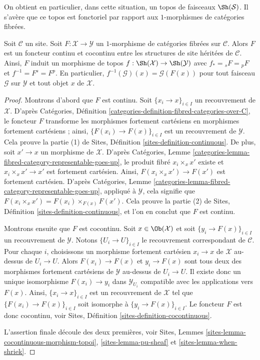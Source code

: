 \noindent
On obtient en particulier, dans cette situation, un topos de faisceaux
$\Sh(\mathcal{S})$. Il s'avère que ce topos est fonctoriel par rapport
aux $1$-morphismes de catégories fibrées.

\begin{lemma}
\label{lemma-topology-inherited-functorial}
Soit $\mathcal{C}$ un site. Soit $F : \mathcal{X} \to \mathcal{Y}$
un $1$-morphisme de catégories fibrées sur $\mathcal{C}$.
Alors $F$ est un foncteur continu et cocontinu entre les structures
de site héritées de $\mathcal{C}$. Ainsi, $F$ induit un morphisme de topos
$f : \Sh(\mathcal{X}) \to \Sh(\mathcal{Y})$ avec
$f_* = {}_sF = {}_pF$ et $f^{-1} = F^s = F^p$. En particulier,
$f^{-1}(\mathcal{G})(x) = \mathcal{G}(F(x))$
pour tout faisceau $\mathcal{G}$ sur $\mathcal{Y}$ et tout objet $x$ de $\mathcal{X}$.
\end{lemma}

\begin{proof}
Montrons d'abord que $F$ est continu.
Soit $\{x_i \to x\}_{i \in I}$ un recouvrement de $\mathcal{X}$. D'après
Catégories, Définition \ref{categories-definition-fibred-categories-over-C},
le foncteur $F$ transforme les morphismes fortement cartésiens en morphismes
fortement cartésiens ; ainsi, $\{F(x_i) \to F(x)\}_{i \in I}$ est un recouvrement
de $\mathcal{Y}$. Cela prouve la partie (1) de
Sites, Définition \ref{sites-definition-continuous}.
De plus, soit $x' \to x$ un morphisme de $\mathcal{X}$. D'après
Catégories, Lemme \ref{categories-lemma-fibred-category-representable-goes-up},
le produit fibré $x_i \times_x x'$ existe et $x_i \times_x x' \to x'$
est fortement cartésien. Ainsi, $F(x_i \times_x x') \to F(x')$ est fortement
cartésien. D'après
Catégories, Lemme \ref{categories-lemma-fibred-category-representable-goes-up},
appliqué à $\mathcal{Y}$, cela signifie que
$F(x_i \times_x x') = F(x_i) \times_{F(x)} F(x')$.
Cela prouve la partie (2) de
Sites, Définition \ref{sites-definition-continuous},
et l'on en conclut que $F$ est continu.

\medskip\noindent
Montrons ensuite que $F$ est cocontinu.
Soit $x \in \Ob(\mathcal{X})$ et soit $\{y_i \to F(x)\}_{i \in I}$
un recouvrement de $\mathcal{Y}$. Notons $\{U_i \to U\}_{i \in I}$ le
recouvrement correspondant de $\mathcal{C}$. Pour chaque $i$, choisissons un morphisme
fortement cartésien $x_i \to x$ de $\mathcal{X}$ au-dessus de $U_i \to U$.
Alors $F(x_i) \to F(x)$ et $y_i \to F(x)$ sont tous deux des morphismes
fortement cartésiens de $\mathcal{Y}$ au-dessus de $U_i \to U$. Il existe donc
un unique isomorphisme $F(x_i) \to y_i$ dans $\mathcal{Y}_{U_i}$ compatible
avec les applications vers $F(x)$. Ainsi, $\{x_i \to x\}_{i \in I}$ est un recouvrement de
$\mathcal{X}$ tel que $\{F(x_i) \to F(x)\}_{i \in I}$ soit isomorphe à
$\{y_i \to F(x)\}_{i \in I}$. Le foncteur $F$ est donc cocontinu, voir
Sites, Définition \ref{sites-definition-cocontinuous}.

\medskip\noindent
L'assertion finale découle des deux premières, voir
Sites, Lemmes
\ref{sites-lemma-cocontinuous-morphism-topoi},
\ref{sites-lemma-pu-sheaf} et
\ref{sites-lemma-when-shriek}.
\end{proof}


